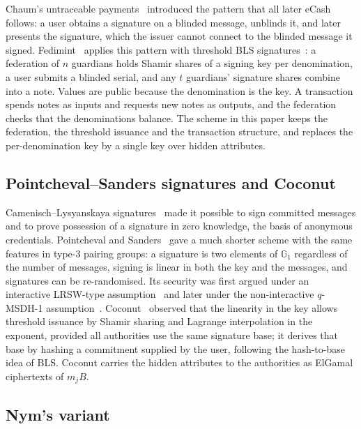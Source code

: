 \documentclass[10pt,a5paper]{article}
\newcommand{\K}[1]{#1}                      %
\newcommand{\Go}[1]{#1}                     %
\newcommand{\K}[1]{{\color{ScalarCol}#1}}   %
\newcommand{\Go}[1]{{\color{GoneCol}#1}}    %
\newcommand{\GG}[1]{\mathbb{G}_{#1}}
\begin{document}
Chaum's untraceable payments~\cite{chaum83} introduced the pattern that all
later eCash follows: a user obtains a signature on a blinded message, unblinds
it, and later presents the signature, which the issuer cannot connect to the
blinded message it signed. Fedimint~\cite{fedimint} applies this pattern with
threshold BLS signatures~\cite{bls01,boldyreva03}: a federation of $n$
guardians holds Shamir shares of a signing key per denomination, a user
submits a blinded serial, and any $t$ guardians' signature shares combine into
a note. Values are public because the denomination is the key. A transaction
spends notes as inputs and requests new notes as outputs, and the federation
checks that the denominations balance. The scheme in this paper keeps the
federation, the threshold issuance and the transaction structure, and replaces
the per-denomination key by a single key over hidden attributes.

\subsection{Pointcheval--Sanders signatures and Coconut}

Camenisch--Lysyanskaya signatures~\cite{cl04} made it possible to sign
committed messages and to prove possession of a signature in zero knowledge,
the basis of anonymous credentials. Pointcheval and Sanders~\cite{ps16} gave a
much shorter scheme with the same features in type-3 pairing groups: a
signature is two elements of $\GG{1}$ regardless of the number of messages,
signing is linear in both the key and the messages, and signatures can be
re-randomised. Its security was first argued under an interactive LRSW-type
assumption~\cite{lrsw99} and later under the non-interactive
$q$-MSDH-1 assumption~\cite{ps18}. Coconut~\cite{coconut} observed that the
linearity in the key allows threshold issuance by Shamir sharing and Lagrange
interpolation in the exponent, provided all authorities use the same signature
base; it derives that base by hashing a commitment supplied by the user,
following the hash-to-base idea of BLS. Coconut carries the hidden attributes
to the authorities as ElGamal ciphertexts of $\K{m_j}\Go{B}$.

\subsection{Nym's variant}
\end{document}
